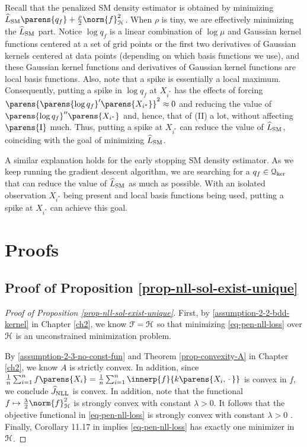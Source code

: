 Recall that the penalized SM density estimator is obtained by minimizing $\widehat{L}_{\SM} \parens{q_f} + \frac{\rho}{2} \norm{f}_{\calH}^2$. When $\rho$ is tiny, we are effectively minimizing the $\widehat{L}_{\mathrm{SM}}$ part. Notice $\log q_f$ is a linear combination of $\log \mu$ and Gaussian kernel functions centered at a set of grid points or the first two derivatives of Gaussian kernels centered at data points (depending on which basis functions we use), and these Gaussian kernel functions and derivatives of Gaussian kernel functions are local basis functions. Also, note that a spike is essentially a local maximum. Consequently, putting a spike in $\log q_f$ at $X_{i^*}$ has the effects of forcing $\parens{\parens{\log q_f}' \parens{X_{i^*}}}^2 \approx 0$ and reducing the value of $\parens{\log q_f}'' \parens{X_{i^*}}$ and, hence, that of (II) a lot, without affecting $\parens{\mathrm{I}}$ much. Thus, putting a spike at $X_{i^*}$ can reduce the value of $\widehat{L}_{\mathrm{SM}}$, coinciding with the goal of minimizing $\widehat{L}_{\mathrm{SM}}$. 

A similar explanation holds for the early stopping SM density estimator. As we keep running the gradient descent algorithm, we are searching for a $q_f \in \mathcal{Q}_{\ker}$ that can reduce the value of $\widehat{L}_{\mathrm{SM}}$ as much as possible. With an isolated observation $X_{i^*}$ being present and local basis functions being used, putting a spike at $X_{i^*}$ can achieve this goal. 

\newpage

\section{Proofs}\label{section-proof}

\subsection{Proof of Proposition \ref{prop-nll-sol-exist-unique}}\label{proof-prop-nll-sol-exist-unique}

\begin{proof}[Proof of Proposition \ref{prop-nll-sol-exist-unique}]
	First, by \ref{assumption-2-2-bdd-kernel} in Chapter \ref{ch2}, we know $\mathcal{F} = \mathcal{H}$ so that minimizing \eqref{eq-pen-nll-loss} over $\mathcal{H}$ is an unconstrained minimization problem. 
	
	By \ref{assumption-2-3-no-const-fun} and Theorem \ref{prop-convexity-A} in Chapter \ref{ch2}, we know $A$ is strictly convex. In addition, since $\frac{1}{n} \sum_{i=1}^n f \parens{X_i} = \frac{1}{n} \sum_{i=1}^n \innerp{f}{k \parens{X_i, \,\cdot\,}}$ is convex in $f$, we conclude $\widehat{J}_{\mathrm{NLL}}$ is convex. In addition, note that the functional $f \mapsto \frac{\lambda}{2} \norm{f}_{\calH}^2$ is strongly convex with constant $\lambda > 0$. It follows that the objective functional in \eqref{eq-pen-nll-loss} is strongly convex with constant $\lambda > 0$ \parencite[Proposition 10.8 in][]{Bauschke2017-he}. Finally, Corollary 11.17 in \textcite{Bauschke2017-he} implies \eqref{eq-pen-nll-loss} has exactly one minimizer in $\mathcal{H}$. 
\end{proof}



